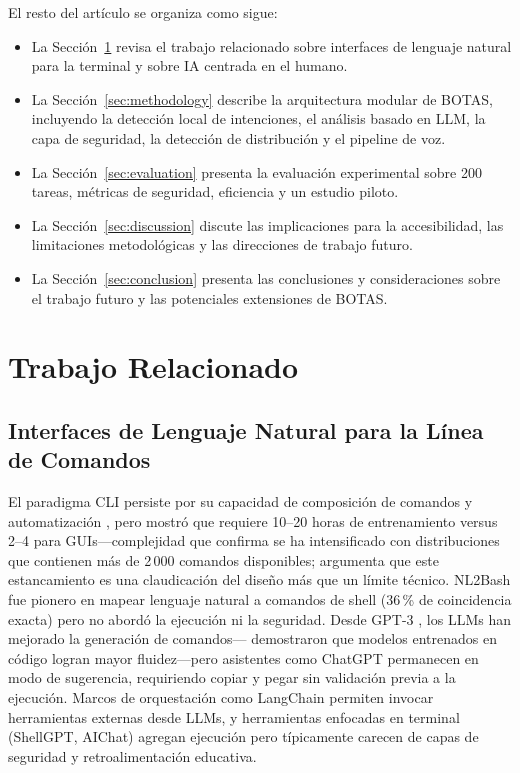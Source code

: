 \documentclass[10pt,a4paper]{article}
\begin{document}
El resto del art\'{i}culo se organiza como sigue:
\begin{itemize}[noitemsep,topsep=2pt]
    \item La Secci\'{o}n~\ref{sec:related-work} revisa el trabajo relacionado sobre interfaces de lenguaje natural para la terminal y sobre IA centrada en el humano.
    \item La Secci\'{o}n~\ref{sec:methodology} describe la arquitectura modular de BOTAS, incluyendo la detecci\'{o}n local de intenciones, el an\'{a}lisis basado en LLM, la capa de seguridad, la detecci\'{o}n de distribuci\'{o}n y el pipeline de voz.
    \item La Secci\'{o}n~\ref{sec:evaluation} presenta la evaluaci\'{o}n experimental sobre 200 tareas, m\'{e}tricas de seguridad, eficiencia y un estudio piloto.
    \item La Secci\'{o}n~\ref{sec:discussion} discute las implicaciones para la accesibilidad, las limitaciones metodol\'{o}gicas y las direcciones de trabajo futuro.
    \item La Secci\'{o}n~\ref{sec:conclusion} presenta las conclusiones y consideraciones sobre el trabajo futuro y las potenciales extensiones de BOTAS.
\end{itemize}


\section{Trabajo Relacionado}
\label{sec:related-work}

\subsection{Interfaces de Lenguaje Natural para la L\'{i}nea de Comandos}
\label{subsec:cli-usability}

El paradigma CLI persiste por su capacidad de composici\'{o}n de comandos y automatizaci\'{o}n \citep{Raymond2003}, pero \citet{Nielsen1994} mostr\'{o} que requiere 10--20 horas de entrenamiento versus 2--4 para GUIs---complejidad que \citet{Dix2004} confirma se ha intensificado con distribuciones que contienen m\'{a}s de 2\,000 comandos disponibles; \citet{Jenson2024} argumenta que este estancamiento es una claudicaci\'{o}n del dise\~{n}o m\'{a}s que un l\'{i}mite t\'{e}cnico. NL2Bash \citep{Lin2018} fue pionero en mapear lenguaje natural a comandos de shell (36\,\% de coincidencia exacta) pero no abord\'{o} la ejecuci\'{o}n ni la seguridad. Desde GPT-3 \citep{Brown2020}, los LLMs han mejorado la generaci\'{o}n de comandos---\citet{Chen2021} demostraron que modelos entrenados en c\'{o}digo logran mayor fluidez---pero asistentes como ChatGPT \citep{OpenAI2023} permanecen en modo de sugerencia, requiriendo copiar y pegar sin validaci\'{o}n previa a la ejecuci\'{o}n. Marcos de orquestaci\'{o}n como LangChain \citep{Chase2022} permiten invocar herramientas externas desde LLMs, y herramientas enfocadas en terminal (ShellGPT, AIChat) agregan ejecuci\'{o}n pero t\'{i}picamente carecen de capas de seguridad y retroalimentaci\'{o}n educativa.
\end{document}
